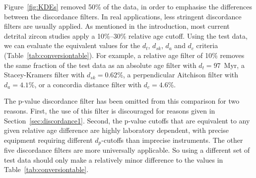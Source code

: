 \documentclass{article}
\begin{document}
Figure~\ref{fig:KDEs} removed 50\% of the data, in order to emphasise
the differences between the discordance filters. In real applications,
less stringent discordance filters are usually applied. As mentioned
in the introduction, most current detrital zircon studies apply a
10\%--30\% relative age cutoff.  Using the test data, we can evaluate
the equivalent values for the $d_t$, $d_{sk}$, $d_a$ and $d_c$
criteria (Table~\ref{tab:conversiontable}). For example, a relative
age filter of 10\% removes the same fraction of the test data as an
absolute age filter with $d_t=97$~Myr, a Stacey-Kramers filter with
$d_{sk}=0.62$\%, a perpendicular Aitchison filter with $d_a=4.1$\%, or
a concordia distance filter with $d_c=4.6$\%.

The p-value discordance filter has been omitted from this comparison
for two reasons. First, the use of this filter is discouraged for
reasons given in Section~\ref{sec:discordance1}. Second, the p-value
cutoffs that are equivalent to any given relative age difference are
highly laboratory dependent, with precise equipment requiring
different $d_p$-cutoffs than imprecise instruments. The other five
discordance filters are more universally applicable. So using a
different set of test data should only make a relatively minor
difference to the values in Table~\ref{tab:conversiontable}.
\end{document}
